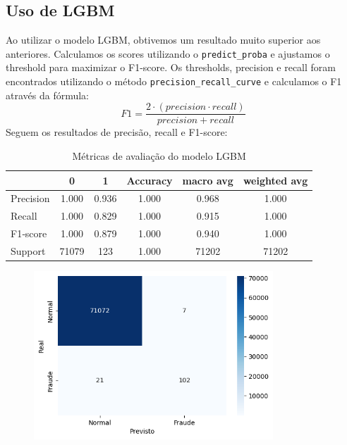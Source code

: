 \documentclass[a4paper,12pt]{article}
\begin{document}
\subsection{Uso de LGBM}
\label{subsec:validacao}
Ao utilizar o modelo LGBM, obtivemos um resultado muito superior aos anteriores. Calculamos os scores utilizando o \texttt{predict\_proba} e ajustamos o threshold para maximizar o F1-score. Os thresholds, precision e recall foram encontrados utilizando o método \texttt{precision\_recall\_curve} e calculamos o F1 através da fórmula:
\begin{equation}
    F1 = \frac{2 \cdot (precision \cdot recall)}{precision + recall}
\end{equation}
Seguem os resultados de precisão, recall e F1-score:
\begin{table}[H]
    \centering
    \begin{tabular}{lccccc}
        \toprule
    & \textbf{0} & \textbf{1} & \textbf{Accuracy} & \textbf{macro avg} & \textbf{weighted avg} \\
        \midrule
        Precision  & 1.000 & 0.936 & 1.000 & 0.968 & 1.000 \\
        Recall     & 1.000 & 0.829 & 1.000 & 0.915 & 1.000 \\
        F1‐score   & 1.000 & 0.879 & 1.000 & 0.940 & 1.000 \\
        Support    & 71079 & 123   & 1.000 & 71202 & 71202  \\
        \bottomrule
    \end{tabular}
    \caption{Métricas de avaliação do modelo LGBM}
    \label{tab:metricas_lgbm}
\end{table}
  \begin{figure}[H]
    \centering
    \includegraphics[width=0.8\textwidth]{../output/matriz confusao lgbm.png}
    \label{fig:matriz_confusao_lgbm}
  \end{figure}
\end{document}

